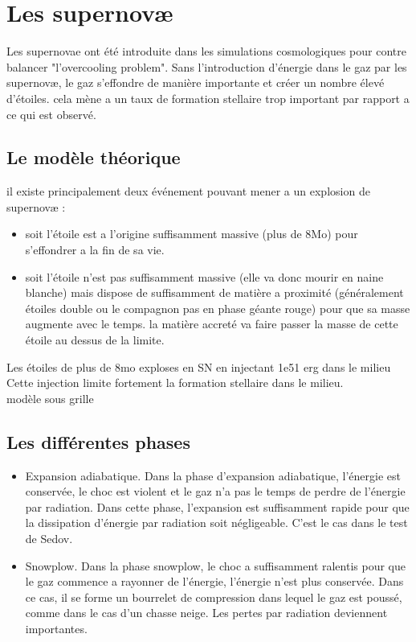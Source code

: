 \section{Les supernovæ}


Les supernovae ont été introduite dans les simulations cosmologiques pour contre balancer "l'overcooling problem".
Sans l'introduction d'énergie dans le gaz par les supernovæ, le gaz s'effondre de manière importante et créer un nombre élevé d'étoiles.
cela mène a un taux de formation stellaire trop important par rapport a ce qui est observé.



\subsection{Le modèle théorique}
il existe principalement deux événement pouvant mener a un explosion de supernovæ : 

\begin{itemize}
\item soit l'étoile est a l'origine suffisamment massive (plus de 8Mo) pour s'effondrer a la fin de sa vie.
\item soit l'étoile n'est pas suffisamment massive (elle va donc mourir en naine blanche) mais dispose de suffisamment de matière a proximité (généralement étoiles double ou le compagnon pas en phase géante rouge) pour que sa masse augmente avec le temps.
la matière accreté va faire passer la masse de cette étoile au dessus de la limite.
\end{itemize}

Les étoiles de plus de 8mo exploses en SN en injectant 1e51 erg dans le milieu\\
Cette injection limite fortement la formation stellaire dans le milieu.\\
modèle sous grille\\
 
\subsection{Les différentes phases}

\begin{itemize}
\item Expansion adiabatique.
Dans la phase d'expansion adiabatique, l'énergie est conservée, le choc est violent et le gaz n'a pas le temps de perdre de l'énergie par radiation.
Dans cette phase, l'expansion est suffisamment rapide pour que la dissipation d'énergie par radiation soit négligeable.
C'est le cas dans le test de Sedov.

\item Snowplow.
Dans la phase snowplow, le choc a suffisamment ralentis pour que le gaz commence a rayonner de l'énergie, l'énergie n'est plus conservée.
Dans ce cas, il se forme un bourrelet de compression dans lequel le gaz est poussé, comme dans le cas d'un chasse neige. 
Les pertes par radiation deviennent importantes. 
\end{itemize}

